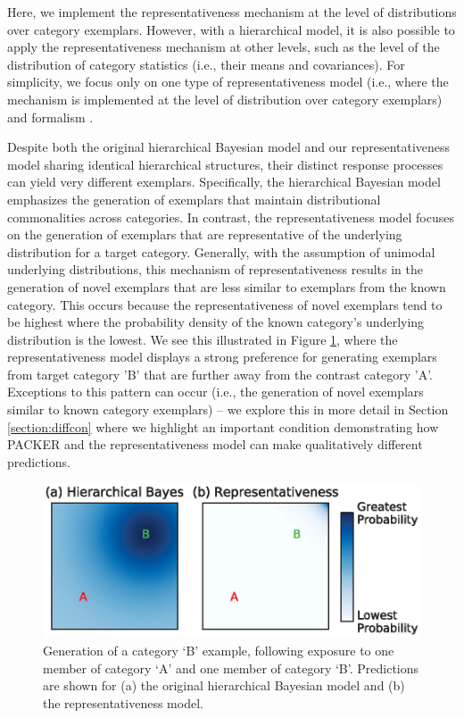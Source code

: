 \documentclass[pdflatex,sn-apa]{sn-jnl}%
\theoremstyle{thmstyleone}%
\theoremstyle{thmstyletwo}%
\theoremstyle{thmstylethree}%
\begin{document}
Here, we implement the representativeness mechanism at the level of
distributions over category exemplars. However, with a hierarchical model, it is
also possible to apply the representativeness mechanism at other levels, such as
the level of the distribution of category statistics (i.e., their means and
covariances). For simplicity, we focus only on one type of representativeness
model (i.e., where the mechanism is implemented at the level of distribution
over category exemplars) and formalism \citep[for a related formalization of representativeness, see][]{bordalo21}.

Despite both the original hierarchical Bayesian model and our representativeness
model sharing identical hierarchical structures, their distinct response
processes can yield very different exemplars. Specifically, the hierarchical
Bayesian model emphasizes the generation of exemplars that maintain
distributional commonalities across categories. In contrast, the
representativeness model focuses on the generation of exemplars that are
representative of the underlying distribution for a target category. Generally,
with the assumption of unimodal underlying distributions, this mechanism of
representativeness results in the generation of novel exemplars that are less
similar to exemplars from the known category. This occurs because the
representativeness of novel exemplars tend to be highest where the probability
density of the known category's underlying distribution is the lowest. We see
this illustrated in Figure \ref{fig:representative-examples}, where the
representativeness model displays a strong preference for generating exemplars
from target category 'B' that are further away from the contrast category 'A'.
Exceptions to this pattern can occur (i.e., the generation of novel exemplars
similar to known category exemplars) -- we explore this in more detail in Section
\ref{section:diffcon} where we highlight an important condition demonstrating
how PACKER and the representativeness model can make qualitatively different
predictions.


\begin{figure}
	\begin{center} \includegraphics{figs/fig2.eps}
		\caption{Generation of a category `B' example, following exposure
to one member of category `A' and one member of category `B'. Predictions are
shown for (a) the original hierarchical Bayesian model and (b) the
representativeness model.}
		\label{fig:representative-examples}
	\end{center}
\end{figure}
\end{document}
